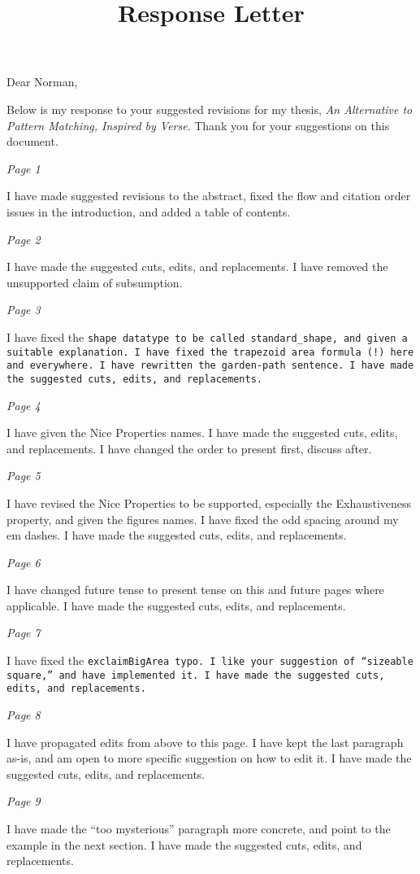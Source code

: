 \documentclass[manuscript,screen, 12pt, nonacm]{acmart}
\title{Response Letter}
\begin{document}
Dear Norman, 

Below is my response to your suggested revisions for my thesis, \textit{An
Alternative to Pattern Matching, Inspired by Verse}. Thank you for your
suggestions on this document. 

\it{Page 1}

I have made suggested revisions to the abstract, fixed the flow and citation
order issues in the introduction, and added a table of contents. 

\it{Page 2}

I have made the suggested cuts, edits, and replacements. I have removed the
unsupported claim of subsumption. 

\it{Page 3}

I have fixed the \tt{shape} datatype to be called \tt{standard\_shape}, and
given a suitable explanation. I have fixed the trapezoid area formula (!) here
and everywhere. I have rewritten the garden-path sentence. I have made the
suggested cuts, edits, and replacements.

\it{Page 4}

I have given the Nice Properties names. I have made the suggested cuts, edits,
and replacements. I have changed the order to present first, discuss after. 

\it{Page 5}

I have revised the Nice Properties to be supported, especially the
Exhaustiveness property, and given the figures names. I have fixed the odd
spacing around my em dashes. I have made the suggested cuts, edits, and
replacements.

\it{Page 6}

I have changed future tense to present tense on this and future pages where
applicable. I have made the suggested cuts, edits, and replacements.

\it{Page 7}

I have fixed the \tt{exclaimBigArea} typo. I like your suggestion of “sizeable
square,” and have implemented it. I have made the suggested cuts, edits, and
replacements. 

\it{Page 8}

I have propagated edits from above to this page. I have kept the last paragraph
as-is, and am open to more specific suggestion on how to edit it. I have made
the suggested cuts, edits, and replacements. 

\it{Page 9}

I have made the “too mysterious” paragraph more concrete, and point to the
example in the next section. I have made the suggested cuts, edits, and
replacements. 
\end{document}
